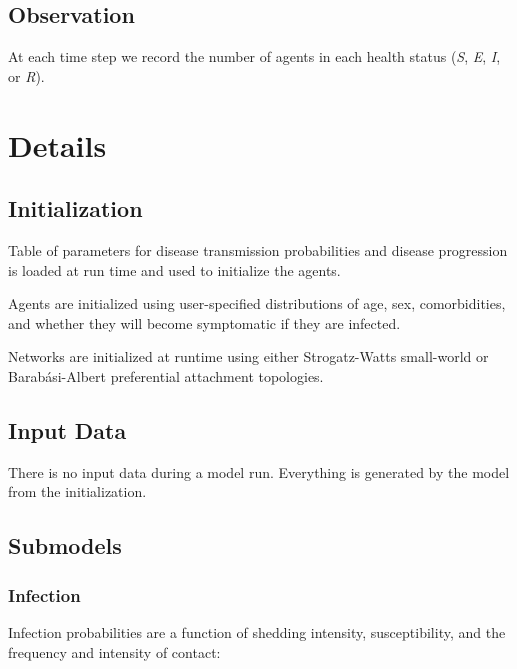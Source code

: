 \documentclass[
]{article}
\begin{document}
\hypertarget{observation}{%
\subsection{Observation}\label{observation}}

At each time step we record the number of agents in each health status
(\emph{S}, \emph{E}, \emph{I}, or \emph{R}).

\hypertarget{details}{%
\section{Details}\label{details}}

\hypertarget{initialization}{%
\subsection{Initialization}\label{initialization}}

Table of parameters for disease transmission probabilities and disease
progression is loaded at run time and used to initialize the agents.

Agents are initialized using user-specified distributions of age, sex,
comorbidities, and whether they will become symptomatic if they are
infected.

Networks are initialized at runtime using either Strogatz-Watts
small-world or Barabási-Albert preferential attachment topologies.

\hypertarget{input-data}{%
\subsection{Input Data}\label{input-data}}

There is no input data during a model run. Everything is generated by
the model from the initialization.

\hypertarget{submodels}{%
\subsection{Submodels}\label{submodels}}

\hypertarget{infection}{%
\subsubsection{Infection}\label{infection}}

Infection probabilities are a function of shedding intensity,
susceptibility, and the frequency and intensity of contact:
\end{document}
